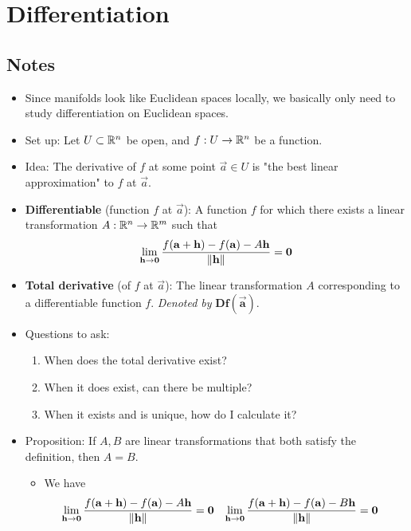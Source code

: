 \documentclass[../notes.tex]{subfiles}
\begin{document}
\chapter{Differentiation}
\section{Notes}
\begin{itemize}
    \item {}Since manifolds look like Euclidean spaces locally, we basically only need to study differentiation on Euclidean spaces.
    \item Set up: Let $U\subset\mathbb{R}^n$ be open, and $f:U\to\mathbb{R}^n$ be a function.
    \item Idea: The derivative of $f$ at some point $\vec{a}\in U$ is "the best linear approximation" to $f$ at $\vec{a}$.
    \item \textbf{Differentiable} (function $f$ at $\vec{a}$): A function $f$ for which there exists a linear transformation $A:\mathbb{R}^n\to\mathbb{R}^m$ such that
    \begin{equation*}
        \lim_{\mathbf{h}\to\bm{0}}\frac{f(\mathbf{a}+\mathbf{h})-f(\mathbf{a})-A\mathbf{h}}{\norm{\mathbf{h}}} = \bm{0}
    \end{equation*}
    \item \textbf{Total derivative} (of $f$ at $\vec{a}$): The linear transformation $A$ corresponding to a differentiable function $f$. \emph{Denoted by} $\bm{Df(\vec{a})}$.
    \item Questions to ask:
    \begin{enumerate}
        \item When does the total derivative exist?
        \item When it does exist, can there be multiple?
        \item When it exists and is unique, how do I calculate it?
    \end{enumerate}
    \item Proposition: If $A,B$ are linear transformations that both satisfy the definition, then $A=B$.
    \begin{itemize}
        \item We have
        \begin{align*}
            \lim_{\mathbf{h}\to\bm{0}}\frac{f(\mathbf{a}+\mathbf{h})-f(\mathbf{a})-A\mathbf{h}}{\norm{\mathbf{h}}} &= \bm{0}&
            \lim_{\mathbf{h}\to\bm{0}}\frac{f(\mathbf{a}+\mathbf{h})-f(\mathbf{a})-B\mathbf{h}}{\norm{\mathbf{h}}} &= \bm{0}
        \end{align*}

\end{itemize}
\end{itemize}
\end{document}
